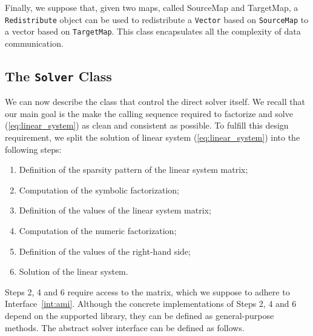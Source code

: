 \documentclass[acmtocl]{acmtrans2m}
\begin{document}
Finally, we suppose that, given two maps, called SourceMap and TargetMap, a
{\tt Redistribute} object can be used to redistribute a {\tt Vector} based on
{\tt SourceMap} to a vector based on {\tt TargetMap}. This class encapsulates
all the complexity of data communication.

\subsection{The {\tt Solver} Class}
\label{sec:asi}

We can now describe the class that control the direct solver itself.
We recall that our main goal is the make the calling sequence required to
factorize and solve (\ref{eq:linear_system}) as clean and consistent as
possible.
To fulfill this design requirement, we split the solution
of linear system (\ref{eq:linear_system}) into the
following steps:
\begin{enumerate}
\item Definition of the sparsity pattern of the linear system matrix;
\item Computation of the symbolic factorization;
\item Definition of the values of the linear system matrix;
\item Computation of the numeric factorization;
\item Definition of the values of the right-hand side;
\item Solution of the linear system.
\end{enumerate}
Steps 2, 4 and 6 require access to the matrix, which we suppose to adhere to
Interface~\ref{int:ami}. Although the concrete implementations of Steps 2, 4
and 6 depend on the supported library, they can be defined as general-purpose
methods.
The abstract solver interface can be defined as follows.
\end{document}
